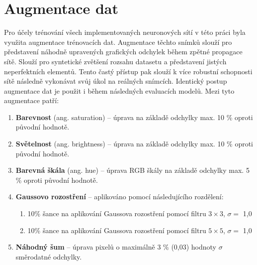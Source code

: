 \section{Augmentace dat}
\label{sec:Chapter41}
Pro účely trénování všech implementovaných neuronových sítí v této práci byla využita augmentace trénovacích dat. Augmentace těchto snímků slouží pro představení náhodně upravených grafických odchylek během zpětné propagace sítě. Slouží pro syntetické zvětšení rozsahu datasetu a představení jistých neperfektních elementů. Tento častý přístup pak slouží k více robustní schopnosti sítě následně vykonávat svůj úkol na reálných snímcích. Identický postup augmentace dat je použit i během následných evaluacích modelů. Mezi tyto augmentace patří:
\begin{enumerate}
  \item \textbf{Barevnost} (ang. saturation) -- úprava na základě odchylky max. 10 \% oproti původní hodnotě.
  \item \textbf{Světelnost} (ang. brightness) -- úprava na základě odchylky max. 10 \% oproti původní hodnotě.
  \item \textbf{Barevná škála} (ang. hue) -- úprava RGB škály na základě odchylky max. 5 \% oproti původní hodnotě.
  \item \textbf{Gaussovo rozostření} -- aplikováno pomocí následujícího rozdělení:
  \begin{enumerate}
      \item 10\% šance na aplikování Gaussova rozostření pomocí filtru $3\times3$, $\sigma=$ 1,0
      \item 10\% šance na aplikování Gaussova rozostření pomocí filtru $5\times5$, $\sigma=$ 1,0
  \end{enumerate}
  \item \textbf{Náhodný šum} -- úprava pixelů o maximálně 3 \% (0,03) hodnoty $\sigma$ směrodatné odchylky.
\end{enumerate}
\endinput